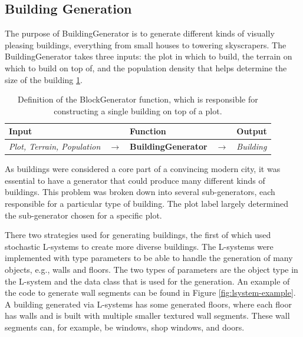 \subsection{Building Generation}
The purpose of BuildingGenerator is to generate different kinds of visually pleasing buildings, everything from small houses to towering skyscrapers. 
The BuildingGenerator takes three inputs: the plot in which to build, the terrain on which to build on top of, and the population density that helps determine the size of the building \ref{table:buildinggen}.

\begin{table}[H]
  \centering
  \begin{tabular}{lllll}
    \textbf{Input}                           &               & \textbf{Function}            &               & \textbf{Output}         \\
    \midrule
    \textit{Plot, Terrain, Population}       & $\rightarrow$ & \textbf{BuildingGenerator}   & $\rightarrow$ & \textit{Building}       \\
    \bottomrule
  \end{tabular}
  
  \caption{Definition of the BlockGenerator function, which is responsible for constructing a single building on top of a plot.}
  \label{table:buildinggen} 
\end{table}
\vspace{-0.4cm} 

As buildings were considered a core part of a convincing modern city, it was essential to have a generator that could produce many different kinds of buildings. 
This problem was broken down into several sub-generators, each responsible for a particular type of building.
The plot label largely determined the sub-generator chosen for a specific plot.

There two strategies used for generating buildings, the first of which used stochastic L-systems to create more diverse buildings.
The L-systems were implemented with type parameters to be able to handle the generation of many objects, e.g., walls and floors.
The two types of parameters are the object type in the L-system and the data class that is used for the generation.
An example of the code to generate wall segments can be found in Figure \ref{fig:lsystem-example}. 
A building generated via L-systems has some generated floors, where each floor has walls and is built with multiple smaller textured wall segments. 
These wall segments can, for example, be windows, shop windows, and doors.

